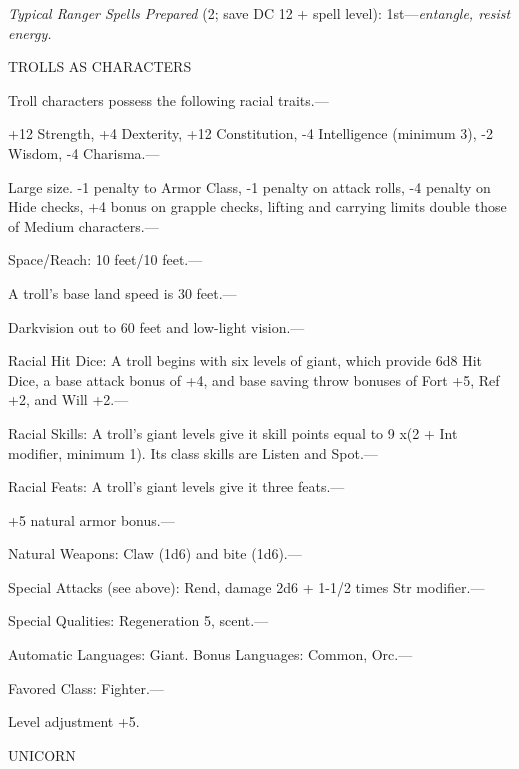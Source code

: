 \documentclass{article}
\begin{document}
\textit{Typical Ranger Spells Prepared }(2; save DC 12 + spell level): 1st---\textit{entangle, 
resist energy.}

\vspace{12pt}
TROLLS AS CHARACTERS

Troll characters possess the following racial traits.--- 

\parindent=3pt
+12 Strength, +4 Dexterity, +12 Constitution, -4 Intelligence (minimum 3), -2 Wisdom, 
-4 Charisma.---

\parindent=0pt
Large size. -1 penalty to Armor Class, -1 penalty on attack rolls, -4 penalty on 
Hide checks, +4 bonus on grapple checks, lifting and carrying limits double those 
of Medium characters.---

Space/Reach: 10 feet/10 feet.---

A troll's base land speed is 30 feet.---

Darkvision out to 60 feet and low-light vision.---

Racial Hit Dice: A troll begins with six levels of giant, which provide 6d8 Hit 
Dice, a base attack bonus of +4, and base saving throw bonuses of Fort +5, Ref 
+2, and Will +2.---

Racial Skills: A troll's giant levels give it skill points equal to 9 x$ $(2 + 
Int modifier, minimum 1). Its class skills are Listen and Spot.---

Racial Feats: A troll's giant levels give it three feats.--- 

\parindent=3pt
+5 natural armor bonus.---

\parindent=0pt
Natural Weapons: Claw (1d6) and bite (1d6).---

Special Attacks (see above): Rend, damage 2d6 + 1-1/2 times Str modifier.---

Special Qualities: Regeneration 5, scent.---

Automatic Languages: Giant. Bonus Languages: Common, Orc.---

Favored Class: Fighter.---

Level adjustment +5.

\vspace{12pt}
{\LARGE{}UNICORN}
\end{document}
